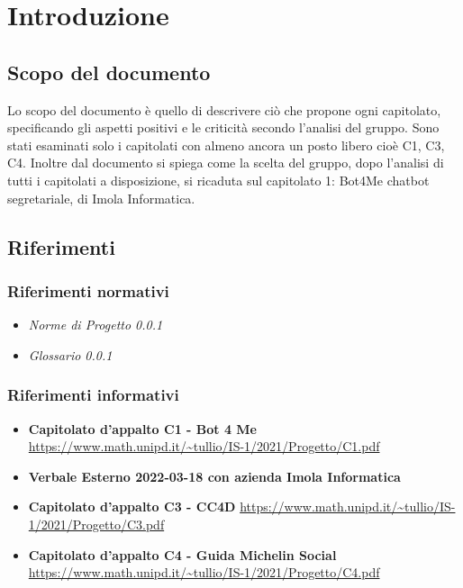 \section{Introduzione}
		\subsection {Scopo del documento}
		Lo scopo del documento è quello di descrivere ciò che propone ogni capitolato, specificando gli aspetti positivi e le criticità secondo l'analisi del gruppo.
		\newline Sono stati esaminati solo i capitolati con almeno ancora un posto libero cioè C1, C3, C4. 
        Inoltre dal documento si spiega come la scelta del gruppo, dopo l'analisi di tutti i capitolati a disposizione, si ricaduta sul capitolato 1: 
        Bot4Me chatbot segretariale, di Imola Informatica.
		\subsection {Riferimenti} 
			\subsubsection {Riferimenti normativi} 
			\begin{itemize}
				\item \textit{Norme di Progetto 0.0.1}
				\item \textit{Glossario 0.0.1}
			\end{itemize}
			\subsubsection {Riferimenti informativi} 
			\begin{itemize}
				\item \textbf{Capitolato d'appalto C1 - Bot 4 Me}\newline
				\url{https://www.math.unipd.it/~tullio/IS-1/2021/Progetto/C1.pdf}
				\item \textbf{Verbale Esterno 2022-03-18 con azienda Imola Informatica}
				\item \textbf{Capitolato d'appalto C3 - CC4D}\newline
				\url{https://www.math.unipd.it/~tullio/IS-1/2021/Progetto/C3.pdf}
				\item \textbf{Capitolato d'appalto C4 - Guida Michelin Social}\newline
				\url{https://www.math.unipd.it/~tullio/IS-1/2021/Progetto/C4.pdf}
			\end{itemize}